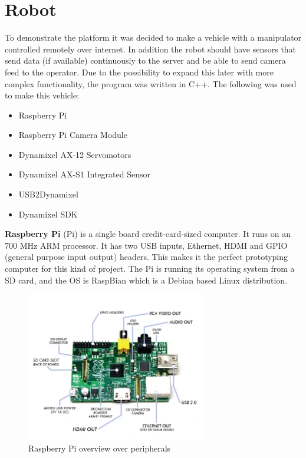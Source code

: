 \section{Robot}
To demonstrate the platform it was decided to make a vehicle with a manipulator controlled remotely over internet. In addition the robot should have sensors that send data (if available) continuously to the server and be able to send camera feed to the operator. Due to the possibility to expand this later with more complex functionality, the program was written in C++.
The following was used to make this vehicle:
\begin{itemize}
    \item Raspberry Pi
    \item Raspberry Pi Camera Module
    \item Dynamixel AX-12 Servomotors
    \item Dynamixel AX-S1 Integrated Sensor
    \item USB2Dynamixel
    \item Dynamixel SDK
\end{itemize}
\vspace{\secspace}

\textbf{Raspberry Pi} (Pi) is a single board credit-card-sized computer. It runs on an 700 MHz ARM processor.
It has two USB inputs, Ethernet, HDMI and GPIO (general purpose input output) headers. 
This makes it the perfect prototyping computer for this kind of project. 
The Pi is running its operating system from a SD card, and the OS is RaspBian which is a Debian based Linux distribution.

\begin{figure}[H]
    \centering
    \includegraphics[width=0.7\textwidth]{graphics/Raspberry_Pi.png}	
    \caption{Raspberry Pi overview over peripherals}
    \label{fig:RPi}
\end{figure}


